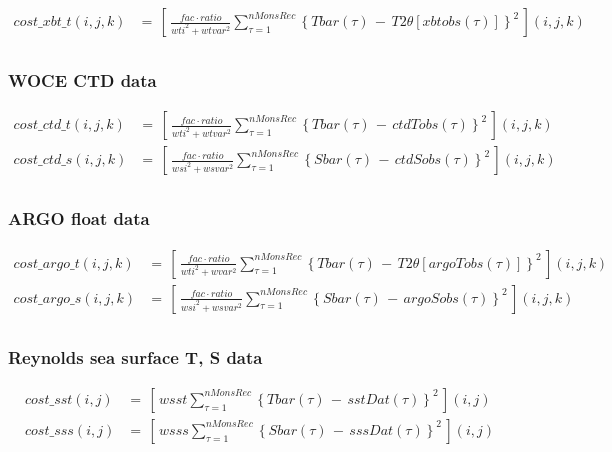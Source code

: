 \begin{equation}
\begin{split}
cost\_xbt\_t(i,j,k) & = \,
\left[ \, \frac{fac \cdot ratio}{wti^2 + wtvar^2} \sum_{\tau=1}^{nMonsRec}
\left\{ Tbar(\tau) \, - \, T2\theta[xbtobs(\tau)] \right\}^2 \, \right](i,j,k)
 \\
\end{split}
\end{equation}

\subsubsection{WOCE CTD data}

\begin{equation}
\begin{split}
cost\_ctd\_t(i,j,k) & = \,
\left[ \, \frac{fac \cdot ratio}{wti^2 + wtvar^2} \sum_{\tau=1}^{nMonsRec}
\left\{ Tbar(\tau) \, - \, ctdTobs(\tau) \right\}^2 \, \right](i,j,k)
 \\
cost\_ctd\_s(i,j,k) & = \,
\left[ \, \frac{fac \cdot ratio}{wsi^2 + wsvar^2} \sum_{\tau=1}^{nMonsRec}
\left\{ Sbar(\tau) \, - \, ctdSobs(\tau) \right\}^2 \, \right](i,j,k)
 \\
\end{split}
\end{equation}

\subsubsection{ARGO float data}

\begin{equation}
\begin{split}
cost\_argo\_t(i,j,k) & = \,
\left[ \, \frac{fac \cdot ratio}{wti^2 + wvar^2} \sum_{\tau=1}^{nMonsRec}
\left\{ Tbar(\tau) \, - \, T2\theta[argoTobs(\tau)] \right\}^2 \, \right](i,j,k)
 \\
cost\_argo\_s(i,j,k) & = \,
\left[ \, \frac{fac \cdot ratio}{wsi^2 + wsvar^2} \sum_{\tau=1}^{nMonsRec}
\left\{ Sbar(\tau) \, - \, argoSobs(\tau) \right\}^2 \, \right](i,j,k)
 \\
\end{split}
\end{equation}

\subsubsection{Reynolds sea surface T, S data}

\begin{equation}
\begin{split}
cost\_sst(i,j) & = \,
\left[ \, wsst \sum_{\tau=1}^{nMonsRec}
\left\{ Tbar(\tau) \, - \, sstDat(\tau) \right\}^2 \, \right](i,j)
 \\
cost\_sss(i,j) & = \,
\left[ \, wsss \sum_{\tau=1}^{nMonsRec}
\left\{ Sbar(\tau) \, - \, sssDat(\tau) \right\}^2 \, \right](i,j)
 \\
\end{split}
\end{equation}

